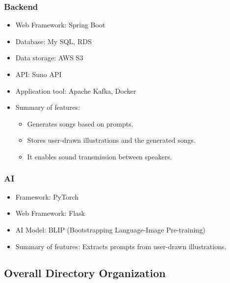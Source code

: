 \documentclass[conference]{IEEEtran}
\begin{document}
 \subsubsection{Backend}
\begin{itemize}
    \item Web Framework: Spring Boot\\
    \item Database: My SQL, RDS\\
    \item Data storage: AWS S3\\
    \item API: Suno API\\
    \item Application tool: Apache Kafka, Docker\\
    \item Summary of features:
\begin{itemize}
    \item Generates songs based on prompts.\\
    \item Stores user-drawn illustrations and the generated songs.\\
    \item It enables sound transmission between speakers.\\
\end{itemize}
\end{itemize}

\subsubsection{AI}
\begin{itemize}
    \item Framework: PyTorch\\
    \item Web Framework: Flask\\
    \item AI Model: BLIP (Bootstrapping Language-Image Pre-training)\\
    \item Summary of features: Extracts prompts from user-drawn illustrations.\\
\end{itemize}


\subsection{Overall Directory Organization}
\end{document}
